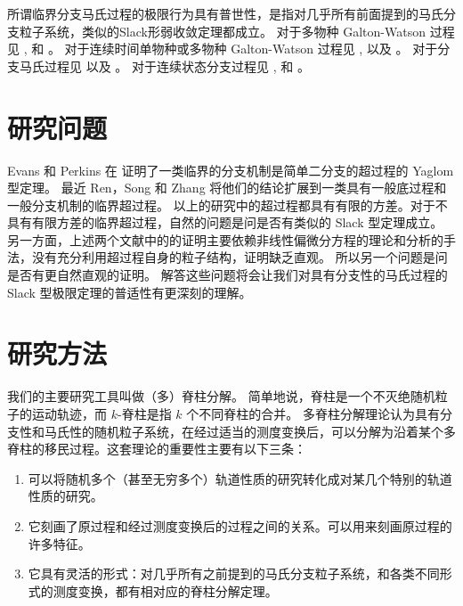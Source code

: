 \documentclass[12pt,a4paper]{article}
\theoremstyle{plain}
\theoremstyle{definition}
\numberwithin{equation}{section}
\begin{document}
	所谓临界分支马氏过程的极限行为具有普世性，是指对几乎所有前面提到的马氏分支粒子系统，类似的Slack形弱收敛定理都成立。
	对于多物种 Galton-Watson 过程见 \cite{JoffeSpitzer1967On-multitype}, \cite{VatutinDyakonova2001The-survival} 和 \cite{GoldsteinHoppe1978Critical}。
	对于连续时间单物种或多物种 Galton-Watson 过程见 \cite{AthreyaNey1972Branching}, \cite{AthreyaNey1974Functionals} 以及 \cite{Vatutin1977Limit}。
	对于分支马氏过程见 \cite{AsmussenHering1983Branching} 以及 \cite{Powell2016An-invariance}。 
	对于连续状态分支过程见 \cite{Li2000Asymptotic}, \cite{KyprianouPardo2008Continuous-state} 和 \cite{RenYangZhao2014Conditional}。

\section{研究问题}

	Evans 和 Perkins 在 \cite{EvansPerkins1990Measure-valued} 证明了一类临界的分支机制是简单二分支的超过程的 Yaglom 型定理。
	最近 Ren，Song 和 Zhang \cite{RenSongZhang2015Limit} 将他们的结论扩展到一类具有一般底过程和一般分支机制的临界超过程。
	以上的研究中的超过程都具有有限的方差。对于不具有有限方差的临界超过程，自然的问题是问是否有类似的 Slack 型定理成立。
	另一方面，上述两个文献中的的证明主要依赖非线性偏微分方程的理论和分析的手法，没有充分利用超过程自身的粒子结构，证明缺乏直观。
	所以另一个问题是问是否有更自然直观的证明。
	解答这些问题将会让我们对具有分支性的马氏过程的 Slack 型极限定理的普适性有更深刻的理解。

\section{研究方法}

	我们的主要研究工具叫做（多）脊柱分解。
	简单地说，脊柱是一个不灭绝随机粒子的运动轨迹，而 $k$-脊柱是指 $k$ 个不同脊柱的合并。
	多脊柱分解理论认为具有分支性和马氏性的随机粒子系统，在经过适当的测度变换后，可以分解为沿着某个多脊柱的移民过程。这套理论的重要性主要有以下三条：
\begin{enumerate}
\item
	可以将随机多个（甚至无穷多个）轨道性质的研究转化成对某几个特别的轨道性质的研究。
\item
	它刻画了原过程和经过测度变换后的过程之间的关系。可以用来刻画原过程的许多特征。
\item
	它具有灵活的形式：对几乎所有之前提到的马氏分支粒子系统，和各类不同形式的测度变换，都有相对应的脊柱分解定理。
\end{enumerate}
\end{document}
